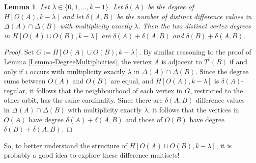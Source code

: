 \documentclass[12pt]{article}
\newtheorem{lem}{Lemma} %
\theoremstyle{definition}
\begin{document}
	\begin{lem}
		Let $\lambda \in \{0, 1, \ldots, k-1\}$.  Let $\delta(A)$ be the degree of $H[O(A),k-\lambda]$ and let $\delta(A,B)$ be the number of distinct difference values in $\Delta(A) \cap \Delta(B)$ with multiplicity exactly $\lambda$.  Then the two distinct vertex degrees in $H[O(A) \cup O(B), k-\lambda]$ are $\delta(A) + \delta(A,B)$ and $\delta(B) + \delta(A,B)$.
	\end{lem}
	\begin{proof}
		Set $G:= H[O(A) \cup O(B), k-\lambda]$.  By similar reasoning to the proof of Lemma \ref{Lemma-DegreeMultiplicities}, the vertex $A$ is adjacent to $T^i(B)$ if and only if $i$ occurs with multiplicity exactly $\lambda$ in $\Delta(A) \cap \Delta(B)$.  Since the degree sums between $O(A)$ and $O(B)$ are equal, and $H[O(A),k-\lambda]$ is $\delta(A)$-regular, it follows that the neighbourhood of each vertex in $G$, restricted to the other orbit, has the same cardinality.  Since there are $\delta(A,B)$ difference values in $\Delta(A) \cap \Delta(B)$ with multiplicity exactly $\lambda$, it follows that the vertices in $O(A)$ have degree $\delta(A) + \delta(A,B)$ and those of $O(B)$ have degree $\delta(B) + \delta(A,B)$. \qedhere
	\end{proof}
	So, to better understand the structure of $H[O(A) \cup O(B), k-\lambda]$, it is probably a good idea to explore these difference multisets!
	
\end{document}

